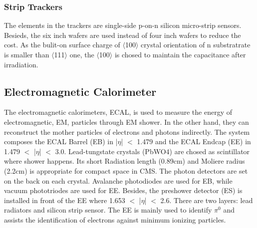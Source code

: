 \subsubsection{Strip Trackers}
The elements in the trackers are single-side p-on-n silicon micro-strip sensors. 
Besieds, the six inch wafers are used instead of four inch wafers to reduce the cost. 
As the bulit-on surface charge of $\langle$100$\rangle$ crystal orientation of n substratrate is smaller than $\langle$111$\rangle$ one, 
the $\langle$100$\rangle$ is chosed to maintain the capacitance after irradiation.

\subsection{Electromagnetic Calorimeter} 
The electromagnetic calorimeters, ECAL, is used to measure the energy of electromagnetic, EM, particles through EM shower. 
In the other hand, they can reconstruct the mother particles of electrons and photons indirectly.
The system composes the ECAL Barrel (EB) in |$\eta $| $<$ 1.479 and the ECAL Endcap (EE) in 1.479 $<$ |$\eta $| $<$ 3.0. 
Lead-tungstate crystals (PbWO4) are chosed as scintillator where shower happens.
Its short Radiation length (0.89cm) and Moliere radius (2.2cm) is appropriate for compact space in CMS.
The photon detectors are set on the back on each crystal. 
Avalanche photodiodes are used for EB, while vacuum phototriodes are used for EE. 
Besides, the preshower detector (ES) is installed in front of the EE where 1.653 $<$ |$\eta $| $<$ 2.6. 
There are two layers: lead radiators and silicon strip sensor.
The EE is mainly used to identify $\pi ^0$ and assists the identification of electrons against minimum ionizing particles.
 

